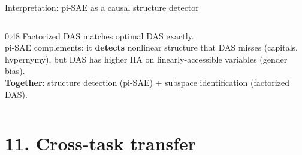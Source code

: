 \documentclass[aspectratio=169,11pt]{beamer}
\begin{document}
\begin{frame}{Interpretation: pi-SAE as a causal structure detector}
\begin{columns}[T]
\begin{column}{0.48\textwidth}
\vspace{0.5em}
{\scriptsize Factorized DAS matches optimal DAS exactly.\\[0.2em]
pi-SAE complements: it \textbf{detects} nonlinear structure that DAS misses (capitals, hypernymy), but DAS has higher IIA on linearly-accessible variables (gender bias).\\[0.2em]
\textbf{Together}: structure detection (pi-SAE) + subspace identification (factorized DAS).}
\end{column}
\end{columns}
\end{frame}

\hypertarget{sec11}{}
\section{11. Cross-task transfer}
\end{document}
